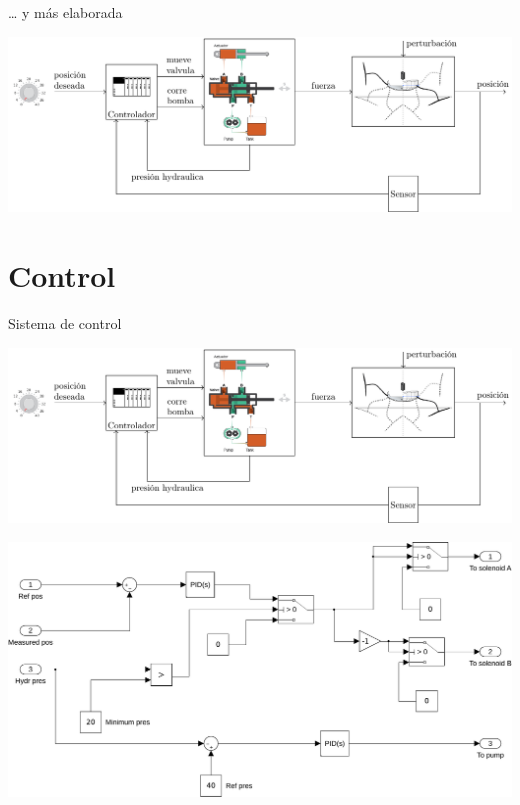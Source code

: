 \documentclass[presentation,aspectratio=169]{beamer}
\begin{document}
\begin{frame}[label={sec:orgbc7f7d6}]{\ldots{} y más elaborada}
\begin{center}
\includegraphics[width=.99\textwidth]{../../figures/ac75-control-block-details}
\end{center}
\end{frame}

\section{Control}
\label{sec:orgd23b6a0}

\begin{frame}[label={sec:org2101103}]{Sistema de control}
\begin{center}
\includegraphics[width=.56\textwidth]{../../figures/ac75-control-block-details}
\end{center}

\begin{center}
\includegraphics[width=.7\textwidth]{../../figures/ac75_control}
\end{center}
\end{frame}
\end{document}
